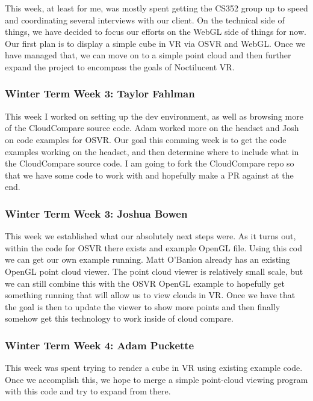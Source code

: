 \documentclass[draftclsnofoot,onecolumn]{IEEEtran}
\begin{document}
This week, at least for me, was mostly spent getting the CS352 group up to speed and coordinating several interviews with our client. On the technical side of things, we have decided to focus our efforts on the WebGL side of things for now. Our first plan is to display a simple cube in VR via OSVR and WebGL. Once we have managed that, we can move on to a simple point cloud and then further expand the project to encompass the goals of Noctilucent VR.

\subsubsection{Winter Term Week 3: Taylor Fahlman}

This week I worked on setting up the dev environment, as well as browsing more of the CloudCompare source code. Adam worked more on the headset and Josh on code examples for OSVR. Our goal this comming week is to get the code examples working on the headset, and then determine where to include what in the CloudCompare source code. I am going to fork the CloudCompare repo so that we have some code to work with and hopefully make a PR against at the end.

\subsubsection{Winter Term Week 3: Joshua Bowen}

This week we established what our absolutely next steps were. As it turns out, within the code for OSVR there exists and example OpenGL file. Using this cod we can get our own example running. Matt O'Banion already has an existing OpenGL point cloud viewer. The point cloud viewer is relatively small scale, but we can still combine this with the OSVR OpenGL example to hopefully get something running that will allow us to view clouds in VR. Once we have that the goal is then to update the viewer to show more points and then finally somehow get this technology to work inside of cloud compare.

\subsubsection{Winter Term Week 4: Adam Puckette}

This week was spent trying to render a cube in VR using existing example code. Once we accomplish this, we hope to merge a simple point-cloud viewing program with this code and try to expand from there.
\end{document}
